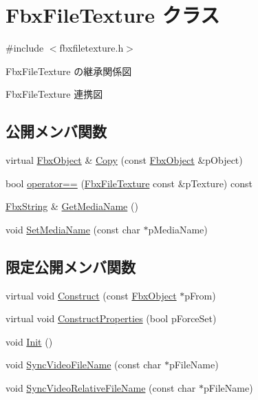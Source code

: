 \hypertarget{class_fbx_file_texture}{}\section{Fbx\+File\+Texture クラス}
\label{class_fbx_file_texture}


{\ttfamily \#include $<$fbxfiletexture.\+h$>$}



Fbx\+File\+Texture の継承関係図


Fbx\+File\+Texture 連携図
\subsection*{公開メンバ関数}
\begin{DoxyCompactItemize}
\item 
virtual \hyperlink{class_fbx_object}{Fbx\+Object} \& \hyperlink{class_fbx_file_texture_a4ef7372132caebc8d1e5992efb894c9d}{Copy} (const \hyperlink{class_fbx_object}{Fbx\+Object} \&p\+Object)
\item 
bool \hyperlink{class_fbx_file_texture_ab2c5320676da40e302a20ef30326d11a}{operator==} (\hyperlink{class_fbx_file_texture}{Fbx\+File\+Texture} const \&p\+Texture) const
\item 
\hyperlink{class_fbx_string}{Fbx\+String} \& \hyperlink{class_fbx_file_texture_afbd2a201ca55d31987446e33133f53cd}{Get\+Media\+Name} ()
\item 
void \hyperlink{class_fbx_file_texture_a08163cb0f5af0e9dee35a1e758618cad}{Set\+Media\+Name} (const char $\ast$p\+Media\+Name)
\end{DoxyCompactItemize}
\subsection*{限定公開メンバ関数}
\begin{DoxyCompactItemize}
\item 
virtual void \hyperlink{class_fbx_file_texture_a107d1612fc50f17722c77ee8df236eeb}{Construct} (const \hyperlink{class_fbx_object}{Fbx\+Object} $\ast$p\+From)
\item 
virtual void \hyperlink{class_fbx_file_texture_a698164ee49ac5fb2a5d5e3e7a2cb9e9f}{Construct\+Properties} (bool p\+Force\+Set)
\item 
void \hyperlink{class_fbx_file_texture_ad9c266407fb8319af33c1969144d6d1e}{Init} ()
\item 
void \hyperlink{class_fbx_file_texture_a8d4cbc0baefe64cd40d88892dd6dda69}{Sync\+Video\+File\+Name} (const char $\ast$p\+File\+Name)
\item 
void \hyperlink{class_fbx_file_texture_a4ae135194f3ebcc0982b3f730adbcb97}{Sync\+Video\+Relative\+File\+Name} (const char $\ast$p\+File\+Name)
\end{DoxyCompactItemize}
